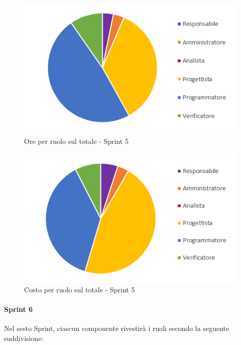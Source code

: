 \begin{figure}[H]
  \centering
  \includegraphics[scale=0.8]{immagini/5Sprint_oreRuolo.png}
  \caption{Ore per ruolo sul totale - Sprint 5}
\end{figure}

\begin{figure}[H]
  \centering
  \includegraphics[scale=0.8]{immagini/5Sprint_costoRuolo.png}
  \caption{Costo per ruolo sul totale - Sprint 5}
\end{figure}
\pagebreak


\paragraph{Sprint 6} \label{paragraph:preventivo_sprint6}
Nel sesto Sprint\glo{}, ciascun componente rivestirà i ruoli secondo la seguente suddivisione:

